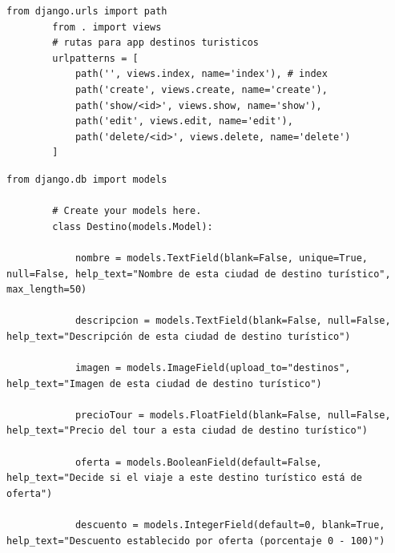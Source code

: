 \documentclass{article}
\begin{document}
        \begin{lstlisting}[caption={Archivo urls.py de app}, label={codigo-urls}]
        from django.urls import path
        from . import views
        # rutas para app destinos turisticos
        urlpatterns = [
            path('', views.index, name='index'), # index
            path('create', views.create, name='create'),
            path('show/<id>', views.show, name='show'),
            path('edit', views.edit, name='edit'),
            path('delete/<id>', views.delete, name='delete')
        ]
        \end{lstlisting}
        
        \begin{lstlisting}[caption={Archivo models.py de app}, label={codigo-modelos}]
        from django.db import models
        
        # Create your models here.
        class Destino(models.Model):
        
            nombre = models.TextField(blank=False, unique=True, null=False, help_text="Nombre de esta ciudad de destino turístico", max_length=50)
        
            descripcion = models.TextField(blank=False, null=False, help_text="Descripción de esta ciudad de destino turístico")
        
            imagen = models.ImageField(upload_to="destinos", help_text="Imagen de esta ciudad de destino turístico")
        
            precioTour = models.FloatField(blank=False, null=False, help_text="Precio del tour a esta ciudad de destino turístico")
        
            oferta = models.BooleanField(default=False, help_text="Decide si el viaje a este destino turístico está de oferta")
        
            descuento = models.IntegerField(default=0, blank=True, help_text="Descuento establecido por oferta (porcentaje 0 - 100)")
        \end{lstlisting}
        
\end{document}
